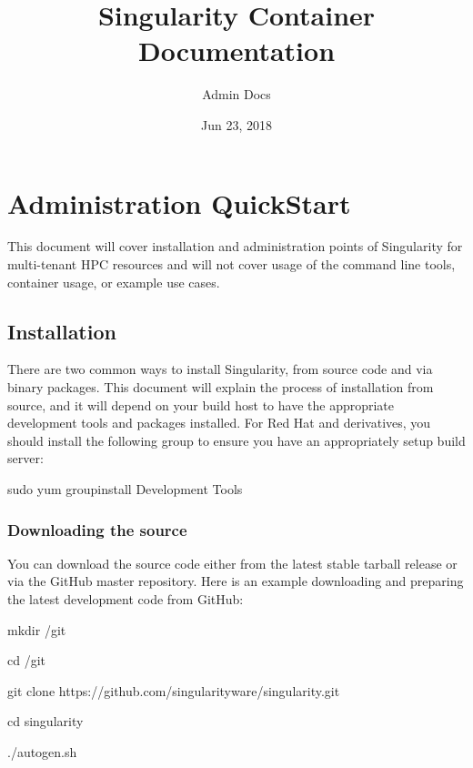 \documentclass[letterpaper,10pt,english]{sphinxmanual}
\title{Singularity Container Documentation}
\date{Jun 23, 2018}
\author{Admin Docs}
\begin{document}
\maketitle
\sphinxtableofcontents
{}\label{\detokenize{index::doc}}



\chapter{Administration QuickStart}
\label{\detokenize{admin_quickstart:administration-quickstart}}\label{\detokenize{admin_quickstart::doc}}
This document will cover installation and administration points of
Singularity for multi-tenant HPC resources and will not cover usage of
the command line tools, container usage, or example use cases.


\section{Installation}
\label{\detokenize{admin_quickstart:installation}}
There are two common ways to install Singularity, from source code and
via binary packages. This document will explain the process of
installation from source, and it will depend on your build host to have
the appropriate development tools and packages installed. For Red Hat
and derivatives, you should install the following  group to ensure you
have an appropriately setup build server:

%
\begin{sphinxVerbatim}[commandchars=\\\{\}]
\PYGZdl{} sudo yum groupinstall \PYGZdq{}Development Tools\PYGZdq{}
\end{sphinxVerbatim}


\subsection{Downloading the source}
\label{\detokenize{admin_quickstart:downloading-the-source}}
You can download the source code either from the latest stable tarball
release or via the GitHub master repository. Here is an example
downloading and preparing the latest development code from GitHub:

%
\begin{sphinxVerbatim}[commandchars=\\\{\}]
\PYGZdl{} mkdir \PYGZti{}/git

\PYGZdl{} cd \PYGZti{}/git

\PYGZdl{} git clone https://github.com/singularityware/singularity.git

\PYGZdl{} cd singularity

\PYGZdl{} ./autogen.sh
\end{sphinxVerbatim}
\end{document}
